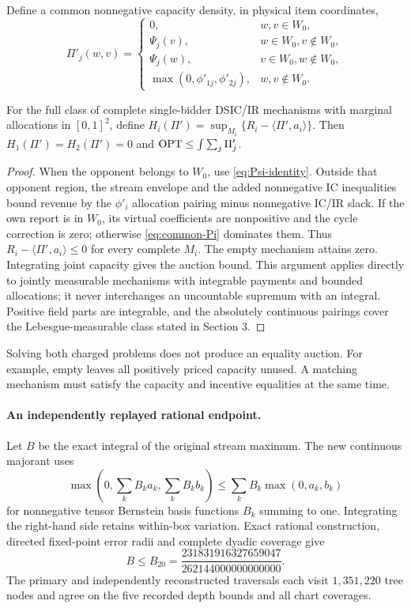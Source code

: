 Define a common nonnegative capacity density, in physical item coordinates,
\begin{equation}\label{eq:common-Pi}
 \Pi'_j(w,v)=\begin{cases}
 0,&w,v\in W_0,\\
 \Psi_j(v),&w\in W_0, v\notin W_0,\\
 \Psi_j(w),&v\in W_0, w\notin W_0,\\
 \max(0,\phi'_{1j},\phi'_{2j}),&w,v\notin W_0.
 \end{cases}
\end{equation}
\begin{theorem}\label{thm:common-support}
For the full class of complete single-bidder DSIC/IR mechanisms with
marginal allocations in $[0,1]^2$, define
$H_i(\Pi')=\sup_{M_i}\{R_i-\langle\Pi',a_i\rangle\}$.
Then $H_1(\Pi')=H_2(\Pi')=0$ and
$\operatorname{OPT}\le\int\sum_j\Pi'_j$.
\end{theorem}
\begin{proof}
When the opponent belongs to $W_0$, use \eqref{eq:Psi-identity}.
Outside that opponent region, the stream envelope and the added
nonnegative IC inequalities bound revenue by the $\phi'_i$ allocation
pairing minus nonnegative IC/IR slack. If the own report is in $W_0$,
its virtual coefficients are nonpositive and the cycle correction is zero;
otherwise \eqref{eq:common-Pi} dominates them. Thus
$R_i-\langle\Pi',a_i\rangle\le0$ for every complete $M_i$.
The empty mechanism attains zero. Integrating joint capacity gives the
auction bound. This argument applies directly to jointly measurable
mechanisms with integrable payments and bounded allocations; it never
interchanges an uncountable supremum with an integral. Positive field
parts are integrable, and the absolutely continuous pairings cover the
Lebesgue-measurable class stated in Section 3.
\end{proof}
Solving both charged problems does not produce an equality auction.
For example, empty leaves all positively priced capacity unused.
A matching mechanism must satisfy the capacity and incentive equalities
at the same time.

\paragraph{An independently replayed rational endpoint.}
Let $B$ be the exact integral of the original stream maximum. The new
continuous majorant uses
\[
 \max\left(0,\sum_k B_k a_k,\sum_k B_k b_k\right)
 \le\sum_k B_k\max(0,a_k,b_k)
\]
for nonnegative tensor Bernstein basis functions $B_k$ summing to one.
Integrating the right-hand side retains within-box variation. Exact
rational construction, directed fixed-point error radii and complete
dyadic coverage give
\[
 B\le B_{20}=\frac{231831916327659047}{262144000000000000}.
\]
The primary and independently reconstructed traversals each visit
$1{,}351{,}220$ tree nodes and agree on the five recorded depth bounds
and all chart coverages.

